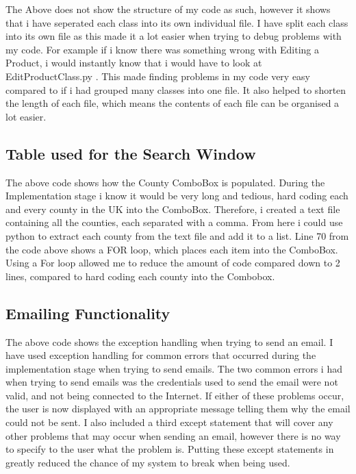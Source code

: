 The Above does not show the structure of my code as such, however it shows that i have seperated each class into its own individual file. I have split each class into its own file as this made it a lot easier when trying to debug problems with my code. For example if i know there was something wrong with Editing a Product, i would instantly know that i would have to look at EditProductClass.py . This made finding problems in my code very easy compared to if i had grouped many classes into one file. It also helped to shorten the length of each file, which means the contents of each file can be organised a lot easier.

\subsection{Table used for the Search Window}
\begin{figure}[H]
\end{figure}

The above code shows how the County ComboBox is populated. During the Implementation stage i know it would be very long and tedious, hard coding each and every county in the UK into the ComboBox. Therefore, i created a text file containing all the counties, each separated with a comma. From here i could use python to extract each county from the text file and add it to a list. Line 70 from the code above shows a FOR loop, which places each item into the ComboBox. Using a For loop allowed me to reduce the amount of code compared down to 2 lines, compared to hard coding each county into the Combobox. 

\subsection{Emailing Functionality}
\begin{figure}[H]
\end{figure}

The above code shows the exception handling when trying to send an email. I have used exception handling for common errors that occurred during the implementation stage when trying to send emails. The two common errors i had when trying to send emails was the credentials used to send the email were not valid, and not being connected to the Internet. If either of these problems occur, the user is now displayed with an appropriate message telling them why the email could not be sent. I also included a third except statement that will cover any other problems that may occur when sending an email, however there is no way to specify to the user what the problem is. Putting these except statements in greatly reduced the chance of my system to break when being used.

